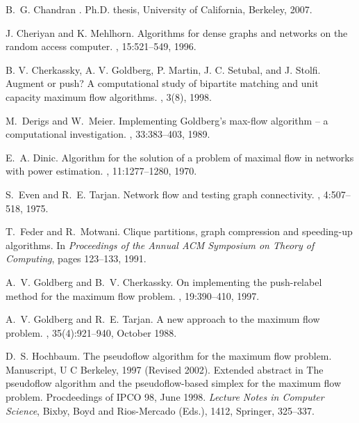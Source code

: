\documentclass{article}
\begin{document}
\begin{thebibliography}{99}
B.~G. Chandran
.
\newblock Ph.D. thesis, University of California, Berkeley, 2007.

J. Cheriyan and K. Mehlhorn.
\newblock Algorithms for dense graphs and networks on the random access computer.
, 15:521--549, 1996.

\newblock B. V. Cherkassky, A. V. Goldberg, P. Martin, J. C. Setubal,
and J. Stolfi.
\newblock Augment or push? A computational study of bipartite matching and unit capacity maximum flow algorithms.
, 3(8), 1998.

M.~Derigs and W.~Meier.
\newblock Implementing {G}oldberg's max-flow algorithm -- a computational investigation.
, 33:383--403, 1989.

E.~A. Dinic.
\newblock Algorithm for the solution of a problem of maximal flow in networks with power estimation.
, 11:1277--1280, 1970.

S.~Even and R.~E. Tarjan.
\newblock Network flow and testing graph connectivity.
, 4:507--518, 1975.

T.~Feder and R.~Motwani.
\newblock Clique partitions, graph compression and speeding-up algorithms.
\newblock In {\em Proceedings of the  Annual ACM Symposium on Theory of Computing}, pages 123--133, 1991.

A.~V. Goldberg and B.~V. Cherkassky.
\newblock On implementing the push-relabel method for the maximum flow problem.
, 19:390--410, 1997.

A.~V. Goldberg and R.~E. Tarjan.
\newblock A new approach to the maximum flow problem.
, 35(4):921--940, October 1988.

D.~S. Hochbaum.
\newblock The pseudoflow algorithm for the maximum flow problem.
\newblock Manuscript, U C Berkeley, 1997 (Revised 2002). Extended abstract in The pseudoflow algorithm and the pseudoflow-based simplex for the maximum flow problem. Procdeedings of IPCO 98, June 1998.  {\em Lecture Notes in Computer Science}, Bixby, Boyd and Rios-Mercado (Eds.), 1412, Springer, 325--337.


\end{thebibliography}
\end{document}
